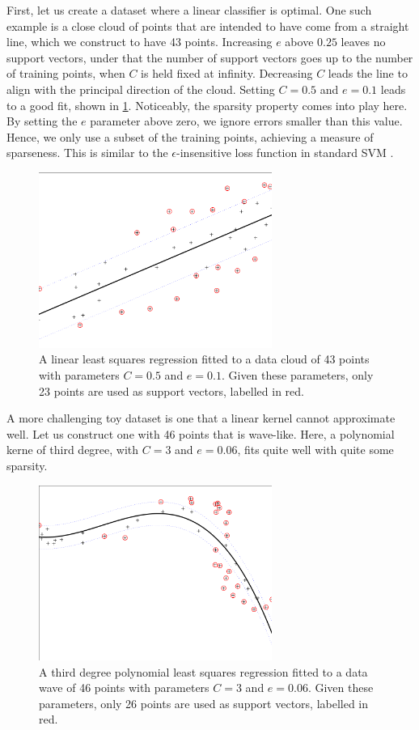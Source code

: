 \documentclass[10pt,a4paper]{article}
\begin{document}
First, let us create a dataset where a linear classifier is optimal. One such example is a close cloud of points that are intended to have come from a straight line, which we construct to have 43 points. Increasing $e$ above $0.25$ leaves no support vectors, under that the number of support vectors goes up to the number of training points, when $C$ is held fixed at infinity. Decreasing $C$ leads the line to align with the principal direction of the cloud. Setting $C=0.5$ and $e=0.1$ leads to a good fit, shown in \ref{fig:uiregress}. Noticeably, the sparsity property comes into play here. By setting the $e$ parameter above zero, we ignore errors smaller than this value. Hence, we only use a subset of the training points, achieving a measure of sparseness. This is similar to the $\epsilon$-insensitive loss function in standard SVM \cite{valyonRobustLSSVMRegression2007}.

\begin{figure}[h!]
  \includegraphics[width=3in]{uiregressFinal.png}
  \caption{A linear least squares regression fitted to a data cloud of 43 points with parameters $C=0.5$ and $e=0.1$. Given these parameters, only 23 points are used as support vectors, labelled in red.}
  \label{fig:uiregress}
\end{figure}

A more challenging toy dataset is one that a linear kernel cannot approximate well. Let us construct one with 46 points that is wave-like. Here, a polynomial kerne of third degree, with $C=3$ and $e=0.06$, fits quite well with quite some sparsity.

\begin{figure}[h!]
  \includegraphics[width=3in]{uiregressPoly.png}
  \caption{A third degree polynomial least squares regression fitted to a data wave of 46 points with parameters $C=3$ and $e=0.06$. Given these parameters, only 26 points are used as support vectors, labelled in red.}
  \label{fig:uiregressPoly}
\end{figure}
\end{document}
